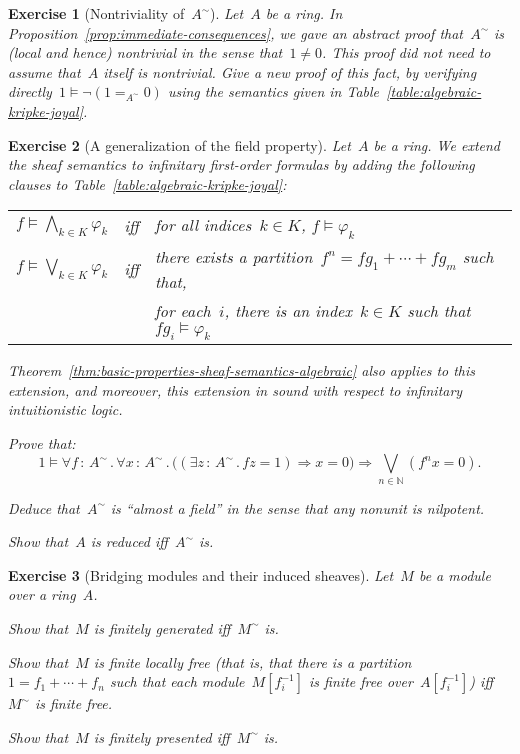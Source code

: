 \documentclass{ws-rv9x6}
\newtheorem{ex}{Exercise}
\newenvironment{exercise}[1]{
  \begin{ex}[#1]
}{\end{ex}}
\newcommand{\NN}{\mathbb{N}}
\renewcommand{\_}{\mathpunct{.}}
\newcommand{\?}{\,{:}\,}
\begin{document}
\begin{exercise}{Nontriviality of~$A^\sim$}%
Let~$A$ be a ring. In Proposition~\ref{prop:immediate-consequences}, we gave an
abstract proof that~$A^\sim$ is (local and hence) nontrivial in the sense that~$1
\neq 0$. This proof did not need to assume that~$A$ itself is nontrivial. Give a new proof of this
fact, by verifying directly~$1 \models \neg(1 =_{A^\sim} 0)$ using the
semantics given in Table~\ref{table:algebraic-kripke-joyal}.
\end{exercise}

\begin{exercise}{A generalization of the field property}%
Let~$A$ be a ring. We extend the sheaf semantics to infinitary first-order
formulas by adding the following clauses to
Table~\ref{table:algebraic-kripke-joyal}:
\begin{center}\tablefont
\begin{tabular}{@{}l@{\ \ }c@{\ \ }l@{}}
  $f \models \bigwedge_{k \in K} \varphi_k$ &iff&
    for all indices~$k \in K$, $f \models \varphi_k$ \\
  $f \models \bigvee_{k \in K} \varphi_k$ &iff&
    there exists a partition~$f^n = fg_1 + \cdots + fg_m$ such that, \\
  &&\quad for each~$i$, there is an index~$k \in K$ such that~$fg_i \models \varphi_k$
\end{tabular}
\end{center}
Theorem~\ref{thm:basic-properties-sheaf-semantics-algebraic}
also applies to this extension, and moreover, this extension in sound with
respect to infinitary intuitionistic logic.
\begin{alphlist}[(c)]
\item Prove that:
\[ 1 \models \forall f\?A^\sim\_ \forall x\?A^\sim\_
  \bigl((\exists z\?A^\sim\_ fz = 1) \Rightarrow x = 0\bigr) \Longrightarrow \bigvee_{n \in \NN} (f^n x = 0). \]
\item Deduce that~$A^\sim$ is ``almost a field'' in the sense that any nonunit
is nilpotent.
\item Show that~$A$ is reduced iff~$A^\sim$ is.
\end{alphlist}
\end{exercise}

\begin{exercise}{Bridging modules and their induced sheaves}%
\label{ex:bridging-modules}%
Let~$M$ be a module over a ring~$A$.
\begin{alphlist}[(c)]
\item Show that~$M$ is finitely generated iff~$M^\sim$ is.
\item Show that~$M$ is finite locally free (that is, that there is a
partition~$1 = f_1 + \cdots + f_n$ such that each module~$M[f_i^{-1}]$ is
finite free over~$A[f_i^{-1}]$) iff~$M^\sim$ is finite free.
\item Show that~$M$ is finitely presented iff~$M^\sim$ is.
\end{alphlist}
\end{exercise}
\end{document}
